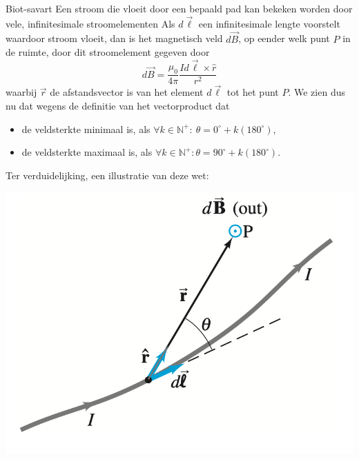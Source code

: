 \begin{lem}{Biot-savart}
    Een stroom die vloeit door een bepaald pad kan bekeken worden door vele, infinitesimale
    stroomelementen
    Als $d\Vec{\ell}$ een infinitesimale lengte voorstelt waardoor stroom
    vloeit, dan is het magnetisch veld $d\Vec{B}$, op eender welk punt $P$ in de ruimte, door
    dit stroomelement gegeven door
    \begin{equation*}
        d\Vec{B} = \dfrac{\mu_{0}}{4\pi}\dfrac{Id\Vec{\ell} \times \hat{r}}{r^2}
    \end{equation*}
    waarbij $\Vec{r}$ de afstandsvector is van het element $d\Vec{\ell}$ tot het punt $P$. 
    We zien dus nu dat wegens de definitie van het vectorproduct dat
    \begin{itemize}
        \item de veldsterkte minimaal is, als $\forall k \in \mathbb{N}^{+}: \ \theta = 0^{\circ} + k(180^{\circ})$,
        \item de veldsterkte maximaal is, als $\forall k \in \mathbb{N}^{+}: \theta = 90^{\circ} + k(180^{\circ})$.
    \end{itemize} 
    Ter verduidelijking, een illustratie van deze wet:
    \begin{center}
        \includegraphics[scale = 0.4]{Images/Magnetisme/BiotSavart.png}

\end{center}
\end{lem}
